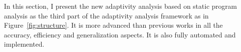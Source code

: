 In this section, I present the new 
adaptivity analysis based on static program analysis as the third part of 
the adaptivity analysis framework as in Figure~\ref{fig:structure}. 
It is more advanced than previous works in all the accuracy, efficiency and generalization aspects.
It is also fully automated and implemented.
% 

% 


